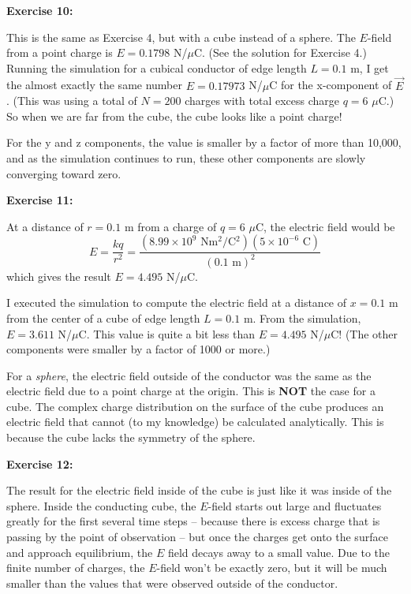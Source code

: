 \documentclass[]{article}
\begin{document}
\textbf{Exercise 10:}

This is the same as Exercise 4, but with a cube instead of a sphere. The
\(E\)-field from a point charge is \(E = 0.1798\) N/\(\mu\)C. (See the
solution for Exercise 4.) Running the simulation for a cubical conductor
of edge length \(L = 0.1\) m, I get the almost exactly the same number
\(E = 0.17973\) N/\(\mu\)C for the x-component of \(\vec{E}\). (This was
using a total of \(N=200\) charges with total excess charge \(q=6\)
\(\mu\)C.) So when we are far from the cube, the cube looks like a point
charge!

For the y and z components, the value is smaller by a factor of more
than 10,000, and as the simulation continues to run, these other
components are slowly converging toward zero.

\textbf{Exercise 11:}

At a distance of \(r=0.1\) m from a charge of \(q = 6\) \(\mu\)C, the
electric field would be
\[E = \frac{kq}{r^2} = \frac{(8.99\times 10^9\textrm{ Nm$^2$/C$^2$})(5\times 10^{-6}\textrm{ C})}{(0.1\textrm{ m})^2}\]
which gives the result \(E = 4.495\) N/\(\mu\)C.

I executed the simulation to compute the electric field at a distance of
\(x = 0.1\) m from the center of a cube of edge length \(L=0.1\) m. From
the simulation, \(E = 3.611\) N/\(\mu\)C. This value is quite a bit less
than \(E = 4.495\) N/\(\mu\)C! (The other components were smaller by a
factor of 1000 or more.)

For a \emph{sphere}, the electric field outside of the conductor was the
same as the electric field due to a point charge at the origin. This is
\textbf{NOT} the case for a cube. The complex charge distribution on the
surface of the cube produces an electric field that cannot (to my
knowledge) be calculated analytically. This is because the cube lacks
the symmetry of the sphere.

\textbf{Exercise 12:}

The result for the electric field inside of the cube is just like it was
inside of the sphere. Inside the conducting cube, the \(E\)-field starts
out large and fluctuates greatly for the first several time steps --
because there is excess charge that is passing by the point of
observation -- but once the charges get onto the surface and approach
equilibrium, the \(E\) field decays away to a small value. Due to the
finite number of charges, the \(E\)-field won't be exactly zero, but it
will be much smaller than the values that were observed outside of the
conductor.
\end{document}
